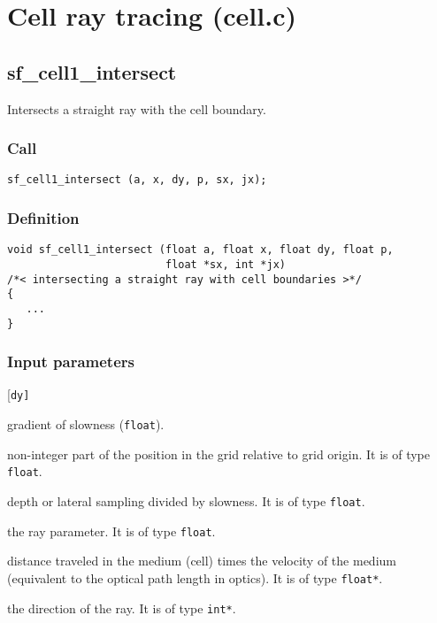 \section{Cell ray tracing (cell.c)}




\subsection{{sf\_cell1\_intersect}}
Intersects a straight ray with the cell boundary.

\subsubsection*{Call}
\begin{verbatim}sf_cell1_intersect (a, x, dy, p, sx, jx);\end{verbatim}

\subsubsection*{Definition}
\begin{verbatim}
void sf_cell1_intersect (float a, float x, float dy, float p, 
                         float *sx, int *jx)
/*< intersecting a straight ray with cell boundaries >*/
{
   ...
}
\end{verbatim}

\subsubsection*{Input parameters}
\begin{desclist}{\tt }{\quad}[\tt dy]
   \setlength\itemsep{0pt}
   \item[a]  gradient of slowness (\texttt{float}).  
   \item[x]  non-integer part of the position in the grid relative to grid origin. It is of type \texttt{float}.
   \item[dy] depth or lateral sampling divided by slowness. It is of type \texttt{float}.
   \item[p]  the ray parameter. It is of type \texttt{float}.
   \item[sx] distance traveled in the medium (cell) times the velocity of the medium (equivalent to the optical path length in optics). It is of type \texttt{float*}.
   \item[jx] the direction of the ray. It is of type \texttt{int*}.
\end{desclist}




